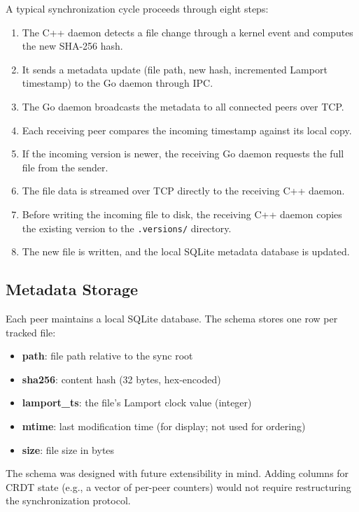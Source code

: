 A typical synchronization cycle proceeds through eight steps:

\begin{enumerate}
    \item The C++ daemon detects a file change through a kernel event and computes the new SHA-256 hash.
    \item It sends a metadata update (file path, new hash, incremented Lamport timestamp) to the Go daemon through IPC.
    \item The Go daemon broadcasts the metadata to all connected peers over TCP.
    \item Each receiving peer compares the incoming timestamp against its local copy.
    \item If the incoming version is newer, the receiving Go daemon requests the full file from the sender.
    \item The file data is streamed over TCP directly to the receiving C++ daemon.
    \item Before writing the incoming file to disk, the receiving C++ daemon copies the existing version to the \texttt{.versions/} directory.
    \item The new file is written, and the local SQLite metadata database is updated.
\end{enumerate}

\subsection{Metadata Storage}

Each peer maintains a local SQLite database. The schema stores one row per tracked file:

\begin{itemize}
    \item \textbf{path}: file path relative to the sync root
    \item \textbf{sha256}: content hash (32 bytes, hex-encoded)
    \item \textbf{lamport\_ts}: the file's Lamport clock value (integer)
    \item \textbf{mtime}: last modification time (for display; not used for ordering)
    \item \textbf{size}: file size in bytes
\end{itemize}

The schema was designed with future extensibility in mind. Adding columns for CRDT state (e.g., a vector of per-peer counters) would not require restructuring the synchronization protocol.

